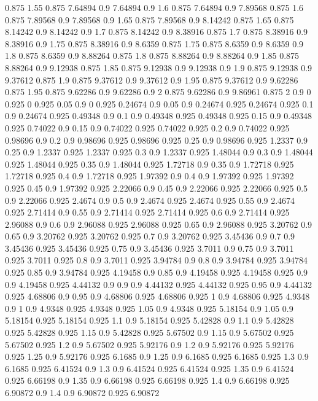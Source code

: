 0.875 1.55
0.875 7.64894
0.9 7.64894
0.9 1.6
0.875 7.64894
0.9 7.89568
0.875 1.6
0.875 7.89568
0.9 7.89568
0.9 1.65
0.875 7.89568
0.9 8.14242
0.875 1.65
0.875 8.14242
0.9 8.14242
0.9 1.7
0.875 8.14242
0.9 8.38916
0.875 1.7
0.875 8.38916
0.9 8.38916
0.9 1.75
0.875 8.38916
0.9 8.6359
0.875 1.75
0.875 8.6359
0.9 8.6359
0.9 1.8
0.875 8.6359
0.9 8.88264
0.875 1.8
0.875 8.88264
0.9 8.88264
0.9 1.85
0.875 8.88264
0.9 9.12938
0.875 1.85
0.875 9.12938
0.9 9.12938
0.9 1.9
0.875 9.12938
0.9 9.37612
0.875 1.9
0.875 9.37612
0.9 9.37612
0.9 1.95
0.875 9.37612
0.9 9.62286
0.875 1.95
0.875 9.62286
0.9 9.62286
0.9 2
0.875 9.62286
0.9 9.86961
0.875 2
0.9 0
0.925 0
0.925 0.05
0.9 0
0.925 0.24674
0.9 0.05
0.9 0.24674
0.925 0.24674
0.925 0.1
0.9 0.24674
0.925 0.49348
0.9 0.1
0.9 0.49348
0.925 0.49348
0.925 0.15
0.9 0.49348
0.925 0.74022
0.9 0.15
0.9 0.74022
0.925 0.74022
0.925 0.2
0.9 0.74022
0.925 0.98696
0.9 0.2
0.9 0.98696
0.925 0.98696
0.925 0.25
0.9 0.98696
0.925 1.2337
0.9 0.25
0.9 1.2337
0.925 1.2337
0.925 0.3
0.9 1.2337
0.925 1.48044
0.9 0.3
0.9 1.48044
0.925 1.48044
0.925 0.35
0.9 1.48044
0.925 1.72718
0.9 0.35
0.9 1.72718
0.925 1.72718
0.925 0.4
0.9 1.72718
0.925 1.97392
0.9 0.4
0.9 1.97392
0.925 1.97392
0.925 0.45
0.9 1.97392
0.925 2.22066
0.9 0.45
0.9 2.22066
0.925 2.22066
0.925 0.5
0.9 2.22066
0.925 2.4674
0.9 0.5
0.9 2.4674
0.925 2.4674
0.925 0.55
0.9 2.4674
0.925 2.71414
0.9 0.55
0.9 2.71414
0.925 2.71414
0.925 0.6
0.9 2.71414
0.925 2.96088
0.9 0.6
0.9 2.96088
0.925 2.96088
0.925 0.65
0.9 2.96088
0.925 3.20762
0.9 0.65
0.9 3.20762
0.925 3.20762
0.925 0.7
0.9 3.20762
0.925 3.45436
0.9 0.7
0.9 3.45436
0.925 3.45436
0.925 0.75
0.9 3.45436
0.925 3.7011
0.9 0.75
0.9 3.7011
0.925 3.7011
0.925 0.8
0.9 3.7011
0.925 3.94784
0.9 0.8
0.9 3.94784
0.925 3.94784
0.925 0.85
0.9 3.94784
0.925 4.19458
0.9 0.85
0.9 4.19458
0.925 4.19458
0.925 0.9
0.9 4.19458
0.925 4.44132
0.9 0.9
0.9 4.44132
0.925 4.44132
0.925 0.95
0.9 4.44132
0.925 4.68806
0.9 0.95
0.9 4.68806
0.925 4.68806
0.925 1
0.9 4.68806
0.925 4.9348
0.9 1
0.9 4.9348
0.925 4.9348
0.925 1.05
0.9 4.9348
0.925 5.18154
0.9 1.05
0.9 5.18154
0.925 5.18154
0.925 1.1
0.9 5.18154
0.925 5.42828
0.9 1.1
0.9 5.42828
0.925 5.42828
0.925 1.15
0.9 5.42828
0.925 5.67502
0.9 1.15
0.9 5.67502
0.925 5.67502
0.925 1.2
0.9 5.67502
0.925 5.92176
0.9 1.2
0.9 5.92176
0.925 5.92176
0.925 1.25
0.9 5.92176
0.925 6.1685
0.9 1.25
0.9 6.1685
0.925 6.1685
0.925 1.3
0.9 6.1685
0.925 6.41524
0.9 1.3
0.9 6.41524
0.925 6.41524
0.925 1.35
0.9 6.41524
0.925 6.66198
0.9 1.35
0.9 6.66198
0.925 6.66198
0.925 1.4
0.9 6.66198
0.925 6.90872
0.9 1.4
0.9 6.90872
0.925 6.90872
